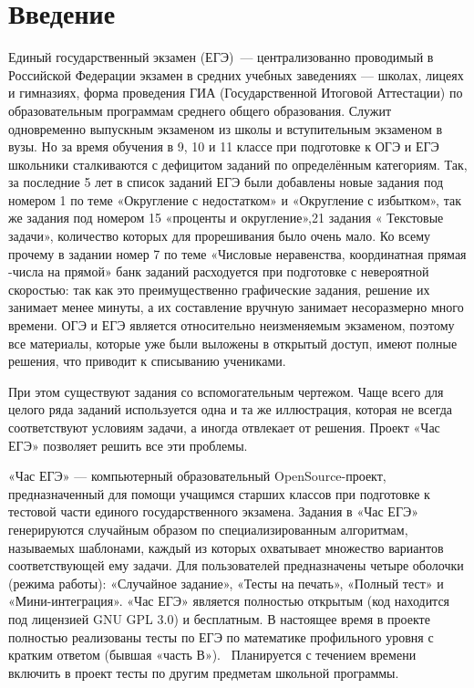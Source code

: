 
\section*{Введение}
Единый государственный экзамен (ЕГЭ)~— централизованно проводимый в Российской
Федерации экзамен в средних учебных заведениях — школах, лицеях и гимназиях,
форма проведения ГИА (Государственной Итоговой Аттестации) по образовательным программам среднего общего образования.
Служит одновременно выпускным экзаменом из школы и вступительным экзаменом в вузы.
Но за время обучения в 9, 10 и 11 классе при подготовке к ОГЭ и ЕГЭ школьники сталкиваются с дефицитом заданий по определённым категориям.
Так, за последние 5 лет в список заданий ЕГЭ были добавлены новые задания под номером 1 по теме «Округление с недостатком» и «Округление с избытком», так же задания под номером 15 «проценты и округление»,21 задания « Текстовые задачи», количество которых для прорешивания было очень мало. 
Ко всему прочему в задании номер 7 по теме «Числовые неравенства, координатная прямая -числа на прямой» банк заданий расходуется при подготовке с невероятной скоростью:
так как это преимущественно графические задания, решение их занимает менее минуты, а их составление вручную занимает несоразмерно много времени. ОГЭ и ЕГЭ является относительно неизменяемым экзаменом, поэтому все материалы, которые уже были выложены в открытый доступ, имеют полные решения, что приводит к списыванию учениками.

При этом существуют задания со вспомогательным чертежом. Чаще всего для целого ряда заданий используется одна и та же иллюстрация, которая не всегда соответствуют условиям задачи, а иногда отвлекает от решения.
Проект «Час ЕГЭ» позволяет решить все эти проблемы.

«Час ЕГЭ» — компьютерный образовательный OpenSource-проект, предназначенный для помощи учащимся
старших классов при подготовке к тестовой части единого государственного экзамена.
Задания в «Час ЕГЭ» генерируются случайным образом по специализированным алгоритмам,
называемых шаблонами, каждый из которых
охватывает множество вариантов соответствующей ему задачи. Для
пользователей
предназначены четыре оболочки (режима работы): «Случайное задание», «Тесты на печать»,
«Полный тест» и «Мини-интеграция».
«Час ЕГЭ» является полностью открытым (код находится под лицензией GNU GPL 3.0)
и бесплатным.
В настоящее время в проекте полностью реализованы тесты по ЕГЭ по математике профильного уровня с кратким
ответом (бывшая «часть В»).~\cite{fipi}
Планируется с течением времени включить в проект тесты по другим предметам школьной
программы.

